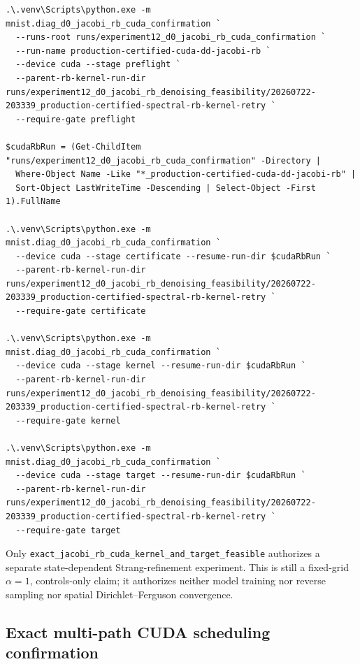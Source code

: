 \documentclass[11pt]{article}
\numberwithin{equation}{section}
\newcommand{\1}{\mathbf 1}
\begin{document}
\begin{Verbatim}[fontsize=\scriptsize,breaklines=true,breakanywhere=true]
.\.venv\Scripts\python.exe -m mnist.diag_d0_jacobi_rb_cuda_confirmation `
  --runs-root runs/experiment12_d0_jacobi_rb_cuda_confirmation `
  --run-name production-certified-cuda-dd-jacobi-rb `
  --device cuda --stage preflight `
  --parent-rb-kernel-run-dir runs/experiment12_d0_jacobi_rb_denoising_feasibility/20260722-203339_production-certified-spectral-rb-kernel-retry `
  --require-gate preflight

$cudaRbRun = (Get-ChildItem "runs/experiment12_d0_jacobi_rb_cuda_confirmation" -Directory |
  Where-Object Name -Like "*_production-certified-cuda-dd-jacobi-rb" |
  Sort-Object LastWriteTime -Descending | Select-Object -First 1).FullName

.\.venv\Scripts\python.exe -m mnist.diag_d0_jacobi_rb_cuda_confirmation `
  --device cuda --stage certificate --resume-run-dir $cudaRbRun `
  --parent-rb-kernel-run-dir runs/experiment12_d0_jacobi_rb_denoising_feasibility/20260722-203339_production-certified-spectral-rb-kernel-retry `
  --require-gate certificate

.\.venv\Scripts\python.exe -m mnist.diag_d0_jacobi_rb_cuda_confirmation `
  --device cuda --stage kernel --resume-run-dir $cudaRbRun `
  --parent-rb-kernel-run-dir runs/experiment12_d0_jacobi_rb_denoising_feasibility/20260722-203339_production-certified-spectral-rb-kernel-retry `
  --require-gate kernel

.\.venv\Scripts\python.exe -m mnist.diag_d0_jacobi_rb_cuda_confirmation `
  --device cuda --stage target --resume-run-dir $cudaRbRun `
  --parent-rb-kernel-run-dir runs/experiment12_d0_jacobi_rb_denoising_feasibility/20260722-203339_production-certified-spectral-rb-kernel-retry `
  --require-gate target
\end{Verbatim}

Only
\nolinkurl{exact_jacobi_rb_cuda_kernel_and_target_feasible}
authorizes a separate state-dependent Strang-refinement experiment.  This is
still a fixed-grid $\alpha=1$, controls-only claim; it authorizes neither
model training nor reverse sampling nor spatial Dirichlet--Ferguson
convergence.

\subsection{Exact multi-path CUDA scheduling confirmation}
\label{sec:d0-jacobi-rb-cuda-multipath}
\end{document}
